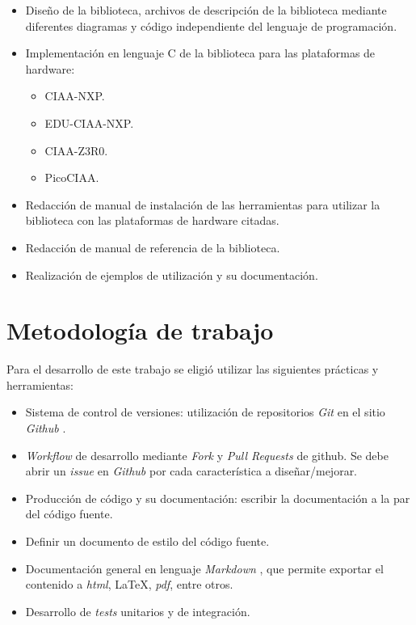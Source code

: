\begin{itemize}
\item
Diseño de la biblioteca, archivos de descripción de la biblioteca mediante diferentes diagramas y código independiente del lenguaje de programación.
\item
Implementación en lenguaje C de la biblioteca para las plataformas de hardware:
\begin{itemize}
\item CIAA-NXP.
\item EDU-CIAA-NXP.
\item CIAA-Z3R0.
\item PicoCIAA.
\end{itemize}
\item
Redacción de manual de instalación de las herramientas para utilizar la biblioteca con las plataformas de hardware citadas.
\item
Redacción de manual de referencia de la biblioteca.
\item
Realización de ejemplos de utilización y su documentación.
\end{itemize}

\section{Metodología de trabajo}

Para el desarrollo de este trabajo se eligió utilizar las siguientes prácticas y herramientas:

\begin{itemize}
\item
Sistema de control de versiones: utilización de repositorios \emph{Git} \citep{GIT} en el sitio \emph{Github} \citep{GITHUB}. 
\item
\emph{Workflow} de desarrollo mediante \emph{Fork} y \emph{Pull Requests} de github. Se debe abrir un \emph{issue} en \emph{Github} por cada característica a diseñar/mejorar.
\item
Producción de código y su documentación: escribir la documentación a la par del código fuente.
\item
Definir un documento de estilo del código fuente.
\item
Documentación general en lenguaje \emph{Markdown} \citep{MARKDOWN}, que permite exportar el contenido a \emph{html}, \LaTeX, \emph{pdf}, entre otros.
\item
Desarrollo de \emph{tests} unitarios y de integración.
\end{itemize}
